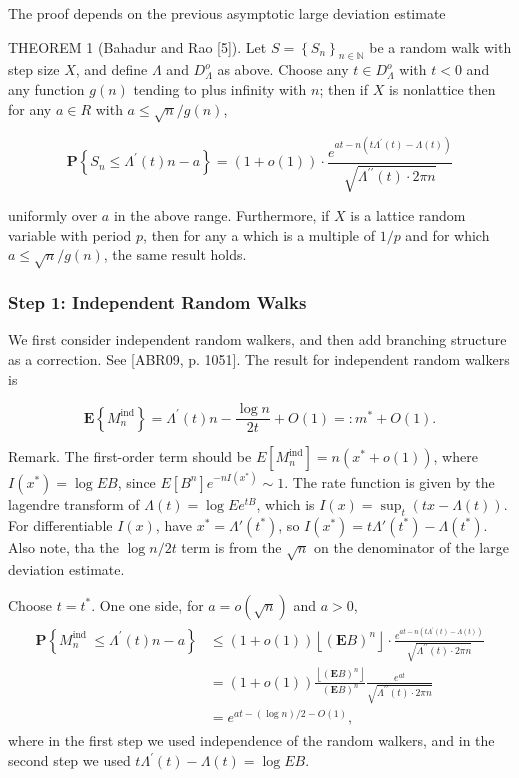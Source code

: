 The proof depends on the previous asymptotic large deviation estimate
\begin{tcolorbox}[colback=gray!10,colframe=black, breakable]
    THEOREM 1 (Bahadur and Rao [5]). Let $S=\left\{S_n\right\}_{n \in \mathbb{N}}$ be a random walk with step size $X$, and define $\Lambda$ and $D_{\Lambda}^o$ as above. Choose any $t \in D_{\Lambda}^o$ with $t<0$ and any function $g(n)$ tending to plus infinity with $n$; then if $X$ is nonlattice then for any $a \in R$ with $a \leq \sqrt{n} / g(n)$,

\[
\mathbf{P}\left\{S_n \leq \Lambda^{\prime}(t) n-a\right\}=(1+o(1)) \cdot \frac{e^{a t-n\left(t \Lambda^{\prime}(t)-\Lambda(t)\right)}}{\sqrt{\Lambda^{\prime \prime}(t) \cdot 2 \pi n}}
\]

uniformly over $a$ in the above range. Furthermore, if $X$ is a lattice random variable with period $p$, then for any a which is a multiple of $1 / p$ and for which $a \leq \sqrt{n} / g(n)$, the same result holds.
\end{tcolorbox}

\subsubsection{Step 1: Independent Random Walks}

We first consider independent random walkers, and then add branching structure as a correction. See [ABR09, p. 1051]. The result for independent random walkers is

\[
\mathbf{E}\left\{M_n^{\mathrm{ind}}\right\}=\Lambda^{\prime}(t) n-\frac{\log n}{2 t}+O(1) =: m^* + O(1).
\]

Remark. The first-order term should be $E[M_n^{\text{ind}}] = n (x^* + o(1))$, where $I(x^*) = \log E B$, since $E[B^n]e^{-n I(x^*)} \sim 1$. The rate function is given by the lagendre transform of $\Lambda(t) = \log E e^{tB}$, which is $I(x) = \sup_{t} (tx - \Lambda(t))$. For differentiable $I(x)$, have $x^* = \Lambda'(t^*)$, so $I(x^*) = t \Lambda'(t^*) - \Lambda(t^*)$. 
Also note, tha the $\log n / 2t$ term is from the $\sqrt{n}$ on the denominator of the large deviation estimate.

Choose $t = t^*$. One one side, for $a = o(\sqrt{n})$ and $a > 0$,
\begin{align*}
    \begin{aligned}
    \mathbf{P}\left\{M_n^{\text {ind }} \leq \Lambda^{\prime}(t) n-a\right\} & \leq(1+o(1))\left\lfloor(\mathbf{E} B)^n\right\rfloor \cdot \frac{e^{a t-n\left(t \Lambda^{\prime}(t)-\Lambda(t)\right)}}{\sqrt{\Lambda^{\prime \prime}(t) \cdot 2 \pi n}} \\
    & =(1+o(1)) \frac{\left\lfloor(\mathbf{E} B)^n\right\rfloor}{(\mathbf{E} B)^n} \frac{e^{a t}}{\sqrt{\Lambda^{\prime \prime}(t) \cdot 2 \pi n}} \\
    & =e^{a t-(\log n) / 2-O(1)},
    \end{aligned}
\end{align*}
where in the first step we used independence of the random walkers, and in the second step we used $t \Lambda^{\prime}(t) - \Lambda(t) = \log E B$.

